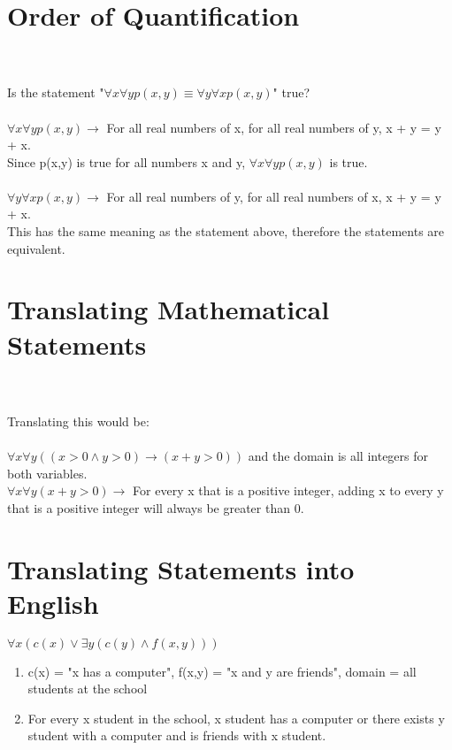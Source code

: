 \documentclass{article}
\begin{document}
\section{Order of Quantification}

\\
\\
Is the statement "$\forall x\forall yp(x,y) \equiv \forall y\forall xp(x,y)$" true?\\
\\
$\forall x\forall yp(x,y) \to$ For all real numbers of x, for all real numbers of y, x + y = y + x.\\
Since p(x,y) is true for all numbers x and y, $\forall x\forall yp(x,y)$ is true.\\
\\
$\forall y\forall xp(x,y) \to$ For all real numbers of y, for all real numbers of x, x + y = y + x.\\
This has the same meaning as the statement above, therefore the statements are equivalent.\\


\section{Translating Mathematical Statements}

\\
\\
Translating this would be:\\
\\
$\forall x\forall y((x > 0 \wedge y > 0) \to (x +y > 0))$ and the domain is all integers for both variables.\\
$\forall x\forall y(x+y>0) \to$ For every x that is a positive integer, adding x to every y that is a positive integer will always be greater than 0.\\


\section{Translating Statements into English}

\begin{center}
    $\forall x(c(x)\vee \exists y(c(y)\wedge f(x,y)))$
\end{center}

\begin{enumerate}
    \item
    c(x) = "x has a computer", f(x,y) = "x and y are friends", domain = all students at the school\\
    
    \item
    For every x student in the school, x student has a computer or there exists y student with a computer and is friends with x student.
\end{enumerate}
\end{document}
